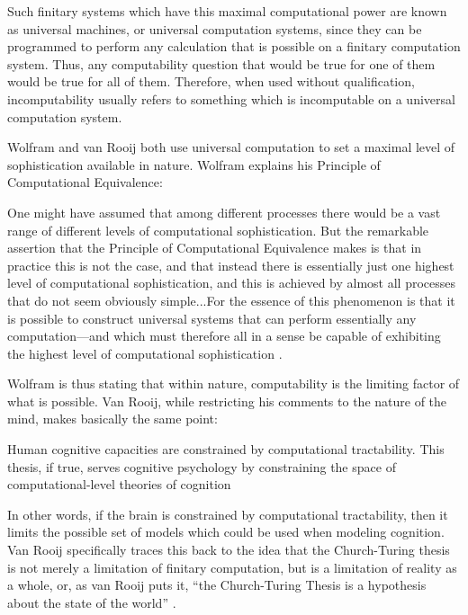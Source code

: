 Such finitary systems which have this maximal computational power are known as universal machines, or universal computation systems, since they can be programmed to perform any calculation that is possible on a finitary computation system.  Thus, any computability question that would be true for one of them would be true for all of them.  Therefore, when used without qualification, incomputability usually refers to something which is incomputable on a universal computation system.

Wolfram and van Rooij both use universal computation to set a maximal level of sophistication available in nature.  Wolfram explains his Principle of Computational Equivalence:

\begin{quoting}
One might have assumed that among different processes there would be a vast range of different levels of computational sophistication.  But the remarkable assertion that the Principle of Computational Equivalence makes is that in practice this is not the case, and that instead there is essentially just one highest level of computational sophistication, and this is achieved by almost all processes that do not seem obviously simple...For the essence of this phenomenon is that it is possible to construct universal systems that can perform essentially any computation---and which must therefore all in a sense be capable of exhibiting the highest level of computational sophistication \citep[][p.~717]{wolfram2002}.
\end{quoting}

Wolfram is thus stating that within nature, computability is the limiting factor of what is possible.  Van Rooij, while restricting his comments to the nature of the mind, makes basically the same point:

\begin{quoting}
Human cognitive capacities are constrained by computational tractability.  This thesis, if true, serves cognitive psychology by constraining the space of computational-level theories of cognition \citep[][p.~939]{vanrooij2008}
\end{quoting}

In other words, if the brain is constrained by computational tractability, then it limits the possible set of models which could be used when modeling cognition.  Van Rooij specifically traces this back to the idea that the Church-Turing thesis is not merely a limitation of finitary computation, but is a limitation of reality as a whole, or, as van Rooij puts it, ``the Church-Turing Thesis is a hypothesis about the state of the world'' \citep[][p.~943]{vanrooij2008}.

